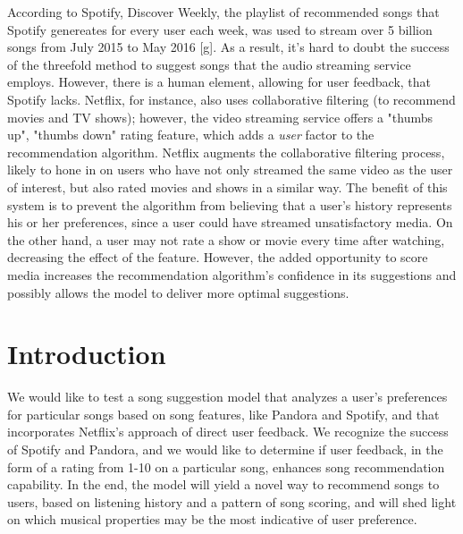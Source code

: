 \documentclass{amsart}
\theoremstyle{plain}
\theoremstyle{definition}
\begin{document}
   	According to Spotify, Discover Weekly, the playlist of recommended songs that Spotify genereates for every user each week, was used to stream over 5 billion songs from July 2015 to May 2016 [g]. As a result, it's hard to doubt the success of the threefold method to suggest songs that the audio streaming service employs. However, there is a human element, allowing for user feedback, that Spotify lacks. Netflix, for instance, also uses collaborative filtering (to recommend movies and TV shows); however, the video streaming service offers a "thumbs up", "thumbs down" rating feature, which adds a \textit{user} factor to the recommendation algorithm. Netflix augments the collaborative filtering process, likely to hone in on users who have not only streamed the same video as the user of interest, but also rated movies and shows in a similar way. The benefit of this system is to prevent the algorithm from believing that a user's history represents his or her preferences, since a user could have streamed unsatisfactory media. On the other hand, a user may not rate a show or movie every time after watching, decreasing the effect of the feature. However, the added opportunity to score media increases the recommendation algorithm's confidence in its suggestions and possibly allows the model to deliver more optimal suggestions.
   	
   	\section{Introduction}
   	
   	We would like to test a song suggestion model that analyzes a user's preferences for particular songs based on song features, like Pandora and Spotify, and that incorporates Netflix's approach of direct user feedback. We recognize the success of Spotify and Pandora, and we would like to determine if user feedback, in the form of a rating from 1-10 on a particular song, enhances song recommendation capability. In the end, the model will yield a novel way to recommend songs to users, based on listening history and a pattern of song scoring, and will shed light on which musical properties may be the most indicative of user preference. 
   	
\end{document}
